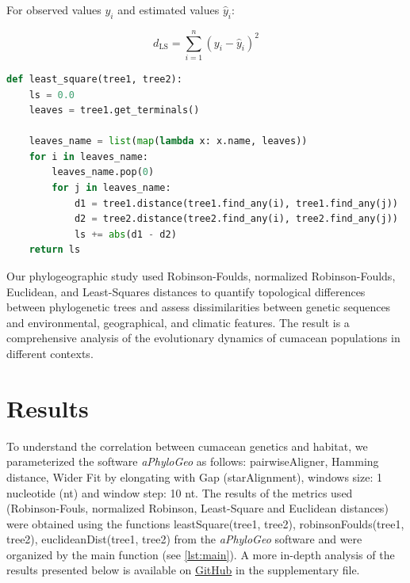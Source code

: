 For observed values $y_i$ and estimated values $\hat{y}_i$:

\begin{equation}\label{eq:ls}
    d_{\text{LS}} = \sum_{i=1}^{n} (y_i - \hat{y}_i)^2
\end{equation}

\begin{lstlisting}[label=lst:LeastSquare, language=Python, caption=Python script for calculating the Least-Square distance using the ete3 package in the aPhyloGeo package]
def least_square(tree1, tree2):
    ls = 0.0
    leaves = tree1.get_terminals()

    leaves_name = list(map(lambda x: x.name, leaves))
    for i in leaves_name:
        leaves_name.pop(0)
        for j in leaves_name:
            d1 = tree1.distance(tree1.find_any(i), tree1.find_any(j))
            d2 = tree2.distance(tree2.find_any(i), tree2.find_any(j))
            ls += abs(d1 - d2)
    return ls
\end{lstlisting}

Our phylogeographic study used Robinson-Foulds, normalized Robinson-Foulds, Euclidean, and Least-Squares distances to quantify topological differences between phylogenetic trees and assess dissimilarities between genetic sequences and environmental, geographical, and climatic features. The result is a comprehensive analysis of the evolutionary dynamics of cumacean populations in different contexts.

\section{Results}\label{results}

To understand the correlation between cumacean genetics and habitat, we parameterized the software \textit{aPhyloGeo} as follows: pairwiseAligner, Hamming distance, Wider Fit by elongating with Gap (starAlignment), windows size: 1 nucleotide (nt) and window step: 10 nt. The results of the metrics used (Robinson-Fouls, normalized Robinson, Least-Square and Euclidean distances) were obtained using the functions leastSquare(tree1, tree2), robinsonFoulds(tree1, tree2), euclideanDist(tree1, tree2) from the \textit{aPhyloGeo} software and were organized by the main function (see \autoref{lst:main}). A more in-depth analysis of the results presented below is available on \href{https://github.com/tahiri-lab/Cumacea_aPhyloGeo}{GitHub} in the supplementary file.

